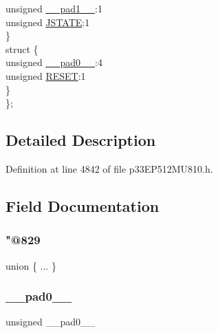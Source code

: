 \begin{DoxyCompactItemize}
\begin{tabbing}
\>\>unsigned \hyperlink{structtag_u1_c_o_n_b_i_t_s_acaf2d0924a107ec6e8d2e31febaf66f9}{\_\_pad1\_\_}:1\\
\>\>unsigned \hyperlink{structtag_u1_c_o_n_b_i_t_s_a10bcacaa4e7114a92d39129463b8813f}{JSTATE}:1\\
\>\} \\
\>struct \{\\
\>\>unsigned \hyperlink{structtag_u1_c_o_n_b_i_t_s_adf71f3d8410c1f1dbbc96680a92c49af}{\_\_pad0\_\_}:4\\
\>\>unsigned \hyperlink{structtag_u1_c_o_n_b_i_t_s_abd544ef72bf6c8e26d48024e20c2ac9b}{RESET}:1\\
\>\} \\
\}; \\

\end{tabbing}\end{DoxyCompactItemize}


\subsection{Detailed Description}


Definition at line 4842 of file p33\+E\+P512\+M\+U810.\+h.



\subsection{Field Documentation}
\mbox{\label{structtag_u1_c_o_n_b_i_t_s_a6d02d2ab49a2556dcb60a6fe5da31576}} 
\subsubsection{\texorpdfstring{"@829}{@829}}
{\footnotesize\ttfamily union \{ ... \} }

\mbox{\label{structtag_u1_c_o_n_b_i_t_s_adf71f3d8410c1f1dbbc96680a92c49af}} 
\subsubsection{\texorpdfstring{\+\_\+\+\_\+pad0\+\_\+\+\_\+}{\_\_pad0\_\_}}
{\footnotesize\ttfamily unsigned \+\_\+\+\_\+pad0\+\_\+\+\_\+}



